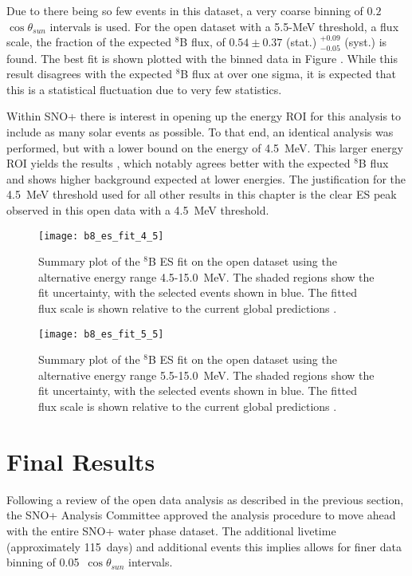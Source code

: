 Due to there being so few events in this dataset, a very coarse binning of $0.2$ $\cos{\theta_{sun}}$ intervals is used.
For the open dataset with a 5.5-MeV threshold, a flux scale, the fraction of the expected $^8$B flux, of $0.54\pm0.37$ (stat.) $^{+0.09}_{-0.05}$ (syst.) is found.
The best fit is shown plotted with the binned data in Figure .
While this result disagrees with the expected $^8$B flux at over one sigma, it is expected that this is a statistical fluctuation due to very few statistics.

Within SNO+ there is interest in opening up the energy ROI for this analysis to include as many solar events as possible.
To that end, an identical analysis was performed, but with a lower bound on the energy of 4.5~MeV.
This larger energy ROI yields the results , which notably agrees better with the expected $^8$B flux and shows higher background expected at lower energies.
The justification for the 4.5~MeV threshold used for all other results in this chapter is the clear ES peak observed in this open data with a 4.5~MeV threshold.

\begin{figure}
\centering
\texttt{[image: b8\_es\_fit\_4\_5]}
\caption{
Summary plot of the $^8$B ES fit on the open dataset using the alternative energy range 4.5-15.0~MeV.
The shaded regions show the fit uncertainty, with the selected events shown in blue.
The fitted flux scale is shown relative to the current global predictions \cite{GlobalSolarFlux}.
}
\label{fig:solar:open45}
\end{figure}

\begin{figure}
\centering
\texttt{[image: b8\_es\_fit\_5\_5]}
\caption{
Summary plot of the $^8$B ES fit on the open dataset using the alternative energy range 5.5-15.0~MeV.
The shaded regions show the fit uncertainty, with the selected events shown in blue.
The fitted flux scale is shown relative to the current global predictions \cite{GlobalSolarFlux}.
}
\label{fig:solar:open55}
\end{figure}

\clearpage

\section{Final Results}
\label{sec:solar:updated}

Following a review of the open data analysis as described in the previous section, the SNO+ Analysis Committee approved the analysis procedure to move ahead with the entire SNO+ water phase dataset.
The additional livetime (approximately 115~days) and additional events this implies allows for finer data binning of 0.05~$\cos{\theta_{sun}}$ intervals.

